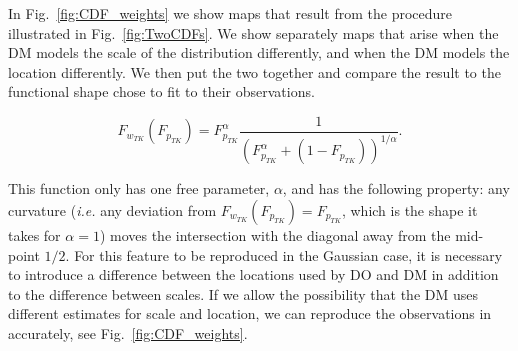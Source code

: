 \documentclass[%
	11pt,
	abstract=true,	
	bibliography=oldstyle					%
]{scrartcl}
\newcommand{\elabel}[1]{\label{eq:#1}}
\newcommand{\eref}[1]{Eq.~(\ref{eq:#1})}
\newcommand{\flabel}[1]{\label{fig:#1}}
\newcommand{\fref}[1]{Fig.~\ref{fig:#1}}
\newcommand{\ie}{\textit{i.e.}\xspace}
\newcommand{\be}{\begin{equation}}
\newcommand{\ee}{\end{equation}}
\numberwithin{equation}{section}
\begin{document}
In \fref{CDF_weights} we show maps that result from the procedure illustrated in \fref{TwoCDFs}. We show separately maps that arise when the DM models the scale of the distribution differently, and when the DM models the location differently. We then put the two together and compare the result to the functional shape \citet{TverskyKahneman1992} chose to fit to their observations.

\be
F_{w_{TK}}(F_{p_{TK}})=F_{p_{TK}}^\alpha \frac{1}{(F_{p_{TK}}^\alpha+(1-F_{p_{TK}}))^{1/\alpha}}.
\elabel{correspondence}
\ee

This function 
only has one free parameter, $\alpha$, and has the following property: any curvature (\ie any deviation from $F_{w_{TK}}(F_{p_{TK}})=F_{p_{TK}}$, which is the shape it takes for $\alpha=1$) moves the intersection with the diagonal away from the mid-point $1/2$. For this feature to be reproduced in the Gaussian case, it is necessary to introduce a difference between the locations used by DO and DM in addition to the difference between scales. If we allow the possibility that the DM uses different estimates for scale and location, we can reproduce the observations in \parencite{TverskyKahneman1992} accurately, see \fref{CDF_weights}.

\end{document}

